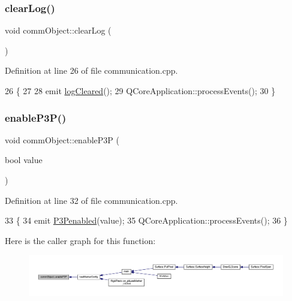 \subsubsection{\texorpdfstring{clear\+Log()}{clearLog()}}
{\footnotesize\ttfamily void comm\+Object\+::clear\+Log (\begin{DoxyParamCaption}{ }\end{DoxyParamCaption})}



Definition at line 26 of file communication.\+cpp.


\begin{DoxyCode}
26                           \{
27 
28     emit \hyperlink{classcomm_object_af2304085624c26230e9d930d616e3e19}{logCleared}();
29     QCoreApplication::processEvents();
30 \}
\end{DoxyCode}
\mbox{\label{classcomm_object_a7552116eb5e18c49c6dcf943de29af7a}} 
\subsubsection{\texorpdfstring{enable\+P3\+P()}{enableP3P()}}
{\footnotesize\ttfamily void comm\+Object\+::enable\+P3P (\begin{DoxyParamCaption}\item[{bool}]{value }\end{DoxyParamCaption})}



Definition at line 32 of file communication.\+cpp.


\begin{DoxyCode}
33 \{
34     emit \hyperlink{classcomm_object_af369de87a7f2c9b7170223bedd6c08d9}{P3Penabled}(value);
35     QCoreApplication::processEvents();
36 \}
\end{DoxyCode}
Here is the caller graph for this function\+:\nopagebreak
\begin{figure}[H]
\begin{center}
\leavevmode
\includegraphics[width=350pt]{classcomm_object_a7552116eb5e18c49c6dcf943de29af7a_icgraph}
\end{center}
\end{figure}
\mbox{\label{classcomm_object_a3828eab6be234f6216a6f80a6a82e41e}} 
